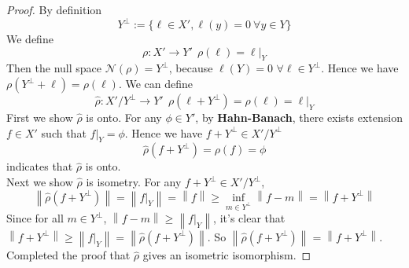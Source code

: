 \documentclass[a4paper, 10pt]{article}
\theoremstyle{definition}
\theoremstyle{hSol}
\begin{document}
\begin{proof} By definition
$$Y^{\bot}:=\{\ell \in X', \ell(y)=0~\forall y\in Y\}$$
We define 
\begin{equation}
	\rho: X' \to Y'~~\rho(\ell) = \ell|_Y
\end{equation}
Then the null space $\mathcal{N}(\rho)=Y^{\bot}$, because $\ell(Y)=0$ $\forall \ell \in Y^{\bot}$. Hence we have $\rho(Y^{\bot}+\ell)=\rho(\ell)$. We can define
\begin{equation}
	\hat{\rho}: X'/Y^{\bot} \to Y'~~\rho(\ell+Y^{\bot}) = \rho(\ell) = \ell|_Y
\end{equation}
First we show $\hat{\rho}$ is onto. For any $\phi \in Y'$, by \textbf{Hahn-Banach}, there exists extension $f \in X'$ such that $f|_Y=\phi$. Hence we have $f+Y^{\bot} \in X'/Y^{\bot}$
\begin{equation}
	\hat{\rho}(f+Y^{\bot}) = \rho(f) = \phi
\end{equation}
indicates that $\hat{\rho}$ is onto. \\
Next we show $\hat{\rho}$ is isometry. For any $f+Y^{\bot} \in X'/Y^{\bot}$, 
\begin{equation}
	\left\|\hat{\rho}(f+Y^{\bot})\right\| = \left\|f|_Y\right\| = \left\|f\right\| \geq   \inf\limits_{m\in Y^{\bot}}\left\|f-m\right\| = \left\|f+Y^{\bot}\right\|
\end{equation}
Since for all $m\in Y^{\bot}$, $\left\|f-m\right\|\geq \left\|f|_Y\right\|$, it's clear that $\left\|f+Y^{\bot}\right\|\geq \left\|f|_Y\right\| = \left\|\hat{\rho}(f+Y^{\bot})\right\|$. So $\left\|\hat{\rho}(f+Y^{\bot})\right\| = \left\|f+Y^{\bot}\right\|$. Completed the proof that $\hat{\rho}$ gives an isometric isomorphism.
\end{proof}

~\\
\end{document}
